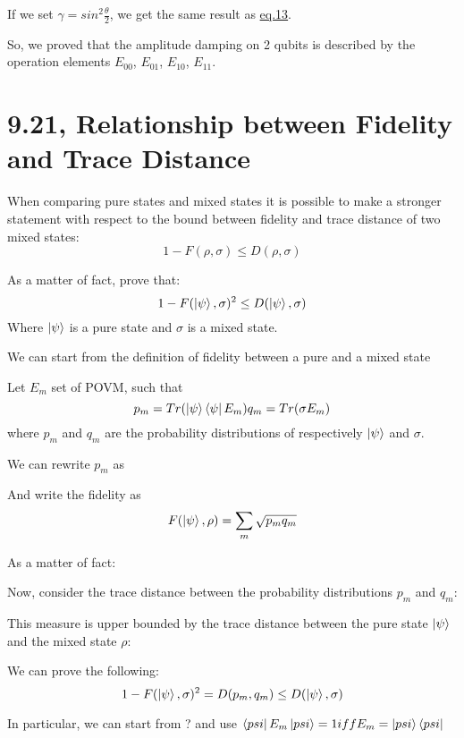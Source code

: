 \documentclass{masterthesis}
\begin{document}
If we set $\gamma=sin^2\frac{\theta}{2}$, we get the same result as \hyperref[eq:ad-dual-rail]{eq.13}.

So, we proved that the amplitude damping on 2 qubits is described by the operation elements \hyperref[eq:op-el-1]{$E_{00}$}, \hyperref[eq:op-el-2]{$E_{01}$}, \hyperref[eq:op-el-3]{$E_{10}$}, \hyperref[eq:op-el-4]{$E_{11}$}.

\newpage
\section*{9.21, Relationship between Fidelity and Trace Distance}

When comparing pure states and mixed states it is possible to make a stronger statement with respect to the bound between fidelity and trace distance of two mixed states:
\begin{equation}
    1 - F(\rho, \sigma) \leq D(\rho, \sigma)
\end{equation}

As a matter of fact, prove that:
\begin{equation}
    1 - F(\ket{\psi}, \sigma)^2 \leq D(\ket{\psi}, \sigma)
\end{equation}
Where $\ket{\psi}$ is a pure state and $\sigma$ is a mixed state.

We can start from the definition of fidelity between a pure and a mixed state

Let $E_m$ set of POVM, such that
\begin{equation}
    p_m = Tr(\ket{\psi}\bra{\psi} E_m)
    q_m = Tr(\sigma E_m)
\end{equation}
where $p_m$ and $q_m$ are the probability distributions of respectively $\ket{\psi}$ and $\sigma$.

We can rewrite $p_m$ as

And write the fidelity as
\begin{equation}
    F(\ket{\psi}, \rho) = \sum_{m} \sqrt{p_m q_m} 
\end{equation}

As a matter of fact:

Now, consider the trace distance between the probability distributions $p_m$ and $q_m$:

This measure is upper bounded by the trace distance between the pure state $\ket{\psi}$ and the mixed state $\rho$:

We can prove the following:
\begin{equation}
    1 - F(\ket{\psi}, \sigma)^2 = D(p_m, q_m) \leq D(\ket{\psi}, \sigma)
\end{equation}

In particular, we can start from ? and use $\bra{psi}E_m\ket{psi} = 1 iff E_m = \ket{psi}\bra{psi}$
\end{document}
